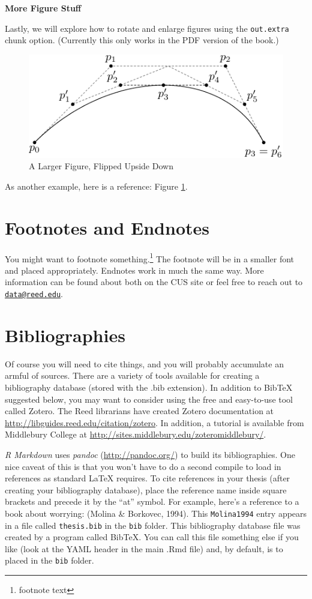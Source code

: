 \documentclass[12pt,twoside]{reedthesis}
\theoremstyle{definition}
\theoremstyle{definition}
\theoremstyle{definition}
\theoremstyle{remark}
\begin{document}
\textbf{More Figure Stuff}

Lastly, we will explore how to rotate and enlarge figures using the
\texttt{out.extra} chunk option. (Currently this only works in the PDF
version of the book.)
\begin{figure}
\includegraphics[angle=180, scale=1.1]{figure/subdivision} \caption{A Larger Figure, Flipped Upside Down}\label{fig:subd2}
\end{figure}
As another example, here is a reference: Figure \ref{fig:subd2}.

\section{Footnotes and Endnotes}\label{footnotes-and-endnotes}

You might want to footnote something.\footnote{footnote text} The
footnote will be in a smaller font and placed appropriately. Endnotes
work in much the same way. More information can be found about both on
the CUS site or feel free to reach out to
\href{mailto:data@reed.edu}{\nolinkurl{data@reed.edu}}.

\section{Bibliographies}\label{bibliographies}

Of course you will need to cite things, and you will probably accumulate
an armful of sources. There are a variety of tools available for
creating a bibliography database (stored with the .bib extension). In
addition to BibTeX suggested below, you may want to consider using the
free and easy-to-use tool called Zotero. The Reed librarians have
created Zotero documentation at
\url{http://libguides.reed.edu/citation/zotero}. In addition, a tutorial
is available from Middlebury College at
\url{http://sites.middlebury.edu/zoteromiddlebury/}.

\emph{R Markdown} uses \emph{pandoc} (\url{http://pandoc.org/}) to build
its bibliographies. One nice caveat of this is that you won't have to do
a second compile to load in references as standard LaTeX requires. To
cite references in your thesis (after creating your bibliography
database), place the reference name inside square brackets and precede
it by the ``at'' symbol. For example, here's a reference to a book about
worrying: (Molina \& Borkovec, 1994). This \texttt{Molina1994} entry
appears in a file called \texttt{thesis.bib} in the \texttt{bib} folder.
This bibliography database file was created by a program called BibTeX.
You can call this file something else if you like (look at the YAML
header in the main .Rmd file) and, by default, is to placed in the
\texttt{bib} folder.
\end{document}
